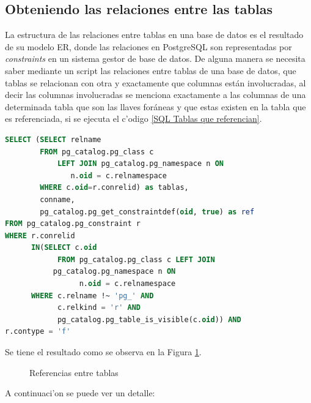\subsection{Obteniendo las relaciones entre las tablas}
La estructura de las relaciones entre tablas en una base de datos es el resultado de su modelo ER, donde las relaciones en PostgreSQL son representadas por \textit{constraints} en un sistema gestor de base de datos.
De alguna manera se necesita saber mediante un script las relaciones entre tablas de una base de datos, que tablas se relacionan con otra y exactamente que columnas est\'an involucradas, al decir las columnas involucradas se menciona exactamente a las columnas de una determinada tabla que son las llaves for\'aneas y que estas existen en la tabla que es referenciada, si se ejecuta el c'odigo \ref{SQL Tablas que referencian}.
\begin{lstlisting}[caption={Query para obtener el detalle de referencias},label={SQL Tablas que referencian},language=sql]
SELECT (SELECT relname
        FROM pg_catalog.pg_class c
        	LEFT JOIN pg_catalog.pg_namespace n ON
		       n.oid = c.relnamespace
        WHERE c.oid=r.conrelid) as tablas,
        conname,
        pg_catalog.pg_get_constraintdef(oid, true) as ref 
FROM pg_catalog.pg_constraint r 
WHERE r.conrelid 
	  IN(SELECT c.oid 
		    FROM pg_catalog.pg_class c LEFT JOIN
           pg_catalog.pg_namespace n ON 
		         n.oid = c.relnamespace 
      WHERE c.relname !~ 'pg_' AND 
            c.relkind = 'r' AND 
            pg_catalog.pg_table_is_visible(c.oid)) AND 
r.contype = 'f'
\end{lstlisting}
 Se tiene el resultado como se observa en la Figura \ref{fig:Referencias entre tablas}.
\begin{figure}[H]
\centering
{}
\caption{Referencias entre tablas} \label{fig:Referencias entre tablas}
\end{figure}
A continuaci'on se puede ver un detalle:
